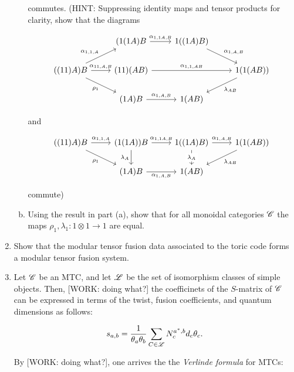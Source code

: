 \documentclass{article}
\theoremstyle{definition}
\numberwithin{figure}{section}
\begin{document}
\begin{enumerate}[\thesection .1.]
\begin{enumerate}[(a)]
commutes. (HINT: Suppressing identity maps and tensor products for clarity, show that the diagrams

\[\begin{tikzcd}
	& {(1(1A)B} & {1((1A)B)} \\
	{((11)A)B} & {(11)(AB)} && {1(1(AB))} \\
	& {(1A)B} & {1(AB)}
	\arrow["{\rho_1}"', from=2-1, to=3-2]
	\arrow["{\alpha_{1,1,A}}", from=2-1, to=1-2]
	\arrow["{\alpha_{1,1A,B}}", from=1-2, to=1-3]
	\arrow["{\alpha_{1,A,B}}", from=1-3, to=2-4]
	\arrow["{\alpha_{1,A,B}}", from=3-2, to=3-3]
	\arrow["{\lambda_{AB}}", from=2-4, to=3-3]
	\arrow["{\alpha_{11,A,B}}", from=2-1, to=2-2]
	\arrow["{\alpha_{1,1,AB}}", from=2-2, to=2-4]
\end{tikzcd}\]

and

\[\begin{tikzcd}
	{((11)A)B} & {(1(1A))B} & {1((1A)B)} & {1(1(AB))} \\
	& {(1A)B} & {1(AB)}
	\arrow["{\alpha_{1,1,A}}", from=1-1, to=1-2]
	\arrow["{\alpha_{1,1A,B}}", from=1-2, to=1-3]
	\arrow["{\alpha_{1,A,B}}", from=1-3, to=1-4]
	\arrow["{\lambda_{AB}}", from=1-4, to=2-3]
	\arrow["{\alpha_{1,A,B}}"', from=2-2, to=2-3]
	\arrow["{\lambda_A}"', from=1-2, to=2-2]
	\arrow["{\lambda_A}"{description}, from=1-3, to=2-3]
	\arrow["{\rho_1}"', from=1-1, to=2-2]
\end{tikzcd}\]

commute)

\item Using the result in part (a), show that for all monoidal categories $\mathscr{C}$ the maps $\rho_1,\lambda_1:1\otimes 1\to 1$ are equal.

\end{enumerate}

\item Show that the modular tensor fusion data associated to the toric code forms a modular tensor fusion system.

\item  Let $\mathscr{C}$ be an MTC, and let $\mathscr{L}$ be the set of isomorphism classes of simple objects. Then, [WORK: doing what?] the coefficinets of the $S$-matrix of $\mathscr{C}$ can be expressed in terms of the twist, fusion coefficients, and quantum dimensions as follows:

$$s_{a,b}=\frac{1}{\theta_a \theta_b}\sum_{C\in \mathscr{L}}N^{a^*,b}_{c}d_{c}\theta_{c}.$$

By [WORK: doing what?], one arrives the the \textit{Verlinde formula} for MTCs:


\end{enumerate}
\end{document}
